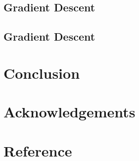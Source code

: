 \section{Gradient Descent}

\section{Gradient Descent}

\chapter{Conclusion}

\chapter{Acknowledgements}

\chapter{Reference}